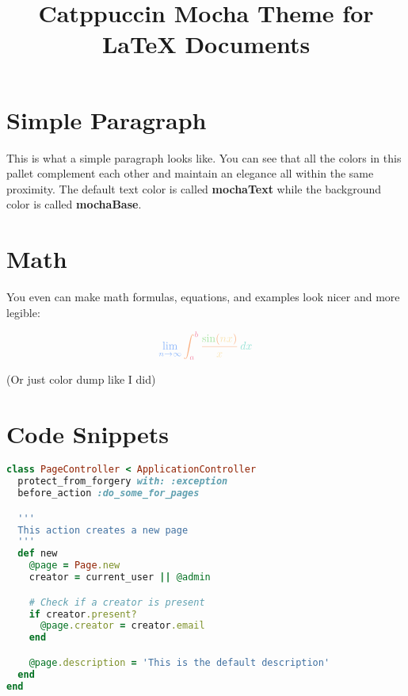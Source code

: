 \documentclass[12pt]{article}
\title{ \Huge \textbf{\textcolor{mochaPink}{Catppuccin Mocha Theme for} \textcolor{mochaLavender}{\LaTeX{} Documents}} \vspace{-3em}}
\date{}
\begin{document}
\maketitle

\section{\textcolor{mochaSky}{Simple Paragraph}}
\textcolor{mochaYellow}{This is what a simple paragraph looks like.} You can see that all the colors in this pallet complement each other and maintain an elegance all within the same proximity. The default text color is called \textbf{\textcolor{mochaGreen}{mochaText}} while the background color is called \textbf{\textcolor{mochaGreen}{mochaBase}}.

\section{\textcolor{mochaSky}{Math}}

You even can make math formulas, equations, and examples look nicer and more legible:


\[\large{
    \textcolor{mochaBlue}{\lim_{{n \to \infty}} \textcolor{mochaPeach}{\int_{\textcolor{mochaRed}{a}}^{\textcolor{mochaRed}{b}} \frac{\textcolor{mochaGreen}{\sin}(\textcolor{mochaYellow}{nx})}{\textcolor{mochaYellow}{x}} \, \textcolor{mochaTeal}{dx}}}
}\]

\tiny{(Or just color dump like I did)}

\section{\textcolor{mochaSky}{Code Snippets}}

\begin{lstlisting}[language=Ruby,style=ruby_on_rails, caption={A ruby on rails code sample}]
class PageController < ApplicationController
  protect_from_forgery with: :exception
  before_action :do_some_for_pages

  '''
  This action creates a new page
  '''
  def new
    @page = Page.new
    creator = current_user || @admin

    # Check if a creator is present
    if creator.present?
      @page.creator = creator.email
    end

    @page.description = 'This is the default description'
  end
end
\end{lstlisting}
\end{document}
